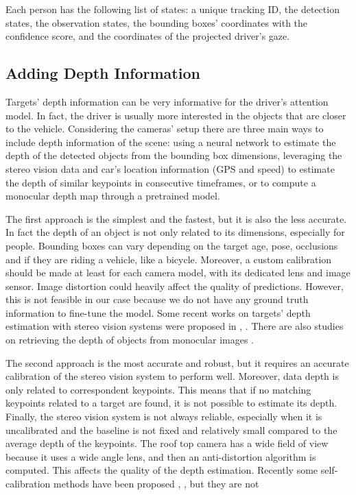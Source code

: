 Each person has the following list of states: a unique tracking ID, the 
detection states, the observation states, the bounding boxes' coordinates with 
the confidence score, and the coordinates of the projected driver's gaze.

\subsection{Adding Depth Information}
Targets' depth information can be very informative for the driver's attention 
model. In fact, the driver is usually more interested in the objects that are 
closer to the vehicle.
Considering the cameras' setup there are three main ways to include depth 
information of the scene: using a neural network to estimate the depth of the 
detected objects from the bounding box dimensions, leveraging the stereo vision 
data and car's location information (GPS and speed) to estimate the depth of 
similar keypoints in consecutive timeframes, or to compute a monocular depth 
map through a pretrained model.

The first approach is the simplest and the fastest, but it is also the less 
accurate. In fact the depth of an object is not only related to its dimensions, 
especially for people. Bounding boxes can vary depending on the target age, pose, 
occlusions and if they are riding a vehicle, like a bicycle. 
Moreover, a custom calibration should be made at least for each camera model, 
with its dedicated lens and image sensor. Image distortion could heavily affect 
the quality of predictions. However, this is not feasible in our case because 
we do not have any ground truth information to fine-tune the model.
Some recent works on targets' depth estimation with stereo vision systems were 
proposed in \cite{li2019stereo}, \cite{Peng_2020_CVPR}. There are also studies 
on retrieving the depth of objects from monocular images \cite{bbox_mde}.

The second approach is the most accurate and robust, but it requires an accurate 
calibration of the stereo vision system to perform well. Moreover, data depth 
is only related to correspondent keypoints. This means that if no matching 
keypoints related to a target are found, it is not possible to estimate its 
depth. Finally, the stereo vision system is not always reliable, especially when 
it is uncalibrated and the baseline is not fixed and relatively small compared to 
the average depth of the keypoints. The roof top camera has a wide field of 
view because it uses a wide angle lens, and then an anti-distortion algorithm 
is computed. This affects the quality of the depth estimation.
Recently some self-calibration methods have been proposed 
\cite{sfm_self_calibration1}, \cite{sfm_self_calibration2}, but they are not

